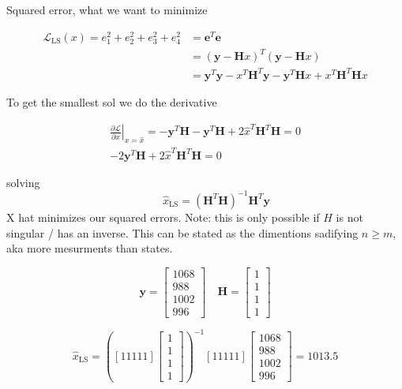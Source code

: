 \documentclass[a4paper]{article}
\begin{document}
Squared error, what we want to minimize

$$\begin{aligned} 
  \mathscr{L}_{\mathrm{LS}}(x)=e_{1}^{2}+e_{2}^{2}+e_{3}^{2}+e_{4}^{2} 
&=\mathbf{e}^{T} \mathbf{e} \\ &=(\mathbf{y}-\mathbf{H} x)^{T}(\mathbf{y}-\mathbf{H} x) 
\\ &=\mathbf{y}^{T} \mathbf{y}-x^{T} \mathbf{H}^{T} \mathbf{y}-\mathbf{y}^{T} \mathbf{H} x+x^{T} 
\mathbf{H}^{T} \mathbf{H} x 
\end{aligned}$$

To get the smallest sol we do the derivative

$$\begin{aligned}
{ \left.\frac{\partial \mathscr{L}}{\partial x}\right|_{x=\hat{x}}=-\mathbf{y}^{T} \mathbf{H}-\mathbf{y}^{T} \mathbf{H}+2 \hat{x}^{T} \mathbf{H}^{T} \mathbf{H}=0} \\
 {-2 \mathbf{y}^{T} \mathbf{H}+2 \hat{x}^{T} \mathbf{H}^{T} \mathbf{H}=0    }
 \end{aligned}$$


solving
$${\qquad \hat{x}_{\mathrm{LS}}=\left(\mathbf{H}^{T} \mathbf{H}\right)^{-1} \mathbf{H}^{T} \mathbf{y}}$$
X hat minimizes our squared errors. Note: this is only possible if $H$
is not singular / has an inverse. This can be stated as the dimentions
sadifying $n \geq m$, aka more mesurments than states.

$$\mathbf{y}=\left[\begin{array}{c}{1068} \\ {988} \\ {1002} \\ {996}\end{array}\right] \quad \mathbf{H}=\left[\begin{array}{l}{1} \\ {1} \\ {1} \\ {1}\end{array}\right]$$

$$\hat{x}_{\mathrm{LS}}=\left([11111]\left[\begin{array}{l}{1} \\ {1} \\ {1} \\ {1}\end{array}\right]\right)^{-1}[11111]\left[\begin{array}{c}{1068} \\ {988} \\ {1002} \\ {996}\end{array}\right] = 1013.5$$
\end{document}
